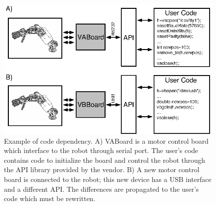 
\begin{figure}[tbp]
\centerline{
\includegraphics[width=24cm]{fig-devices1}
}
\caption{Example of code dependency. A) VABoard is a 
motor control board which interface to the robot through serial port. 
The user's code contains code to initialize the board and control the 
robot through the API library provided by the vendor. B) A new 
motor control board is connected to the robot; this new device has a 
USB interface and a different API. The differences 
are  propagated to the user's code which must be 
rewritten.}\label{fig:devices1}
\end{figure}


